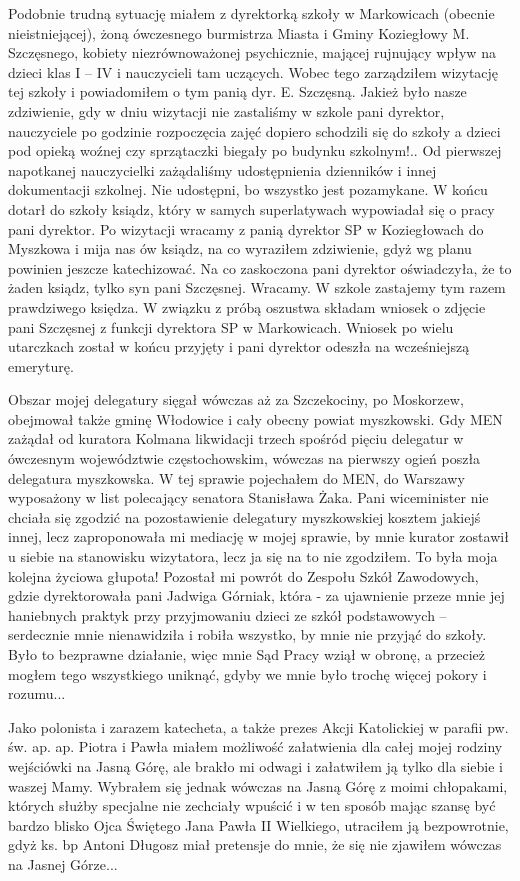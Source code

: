Podobnie trudną sytuację miałem z dyrektorką szkoły w Markowicach (obecnie nieistniejącej), żoną ówczesnego burmistrza Miasta i Gminy Koziegłowy M. Szczęsnego, kobiety niezrównoważonej psychicznie, mającej rujnujący wpływ na dzieci klas I – IV i nauczycieli tam uczących. Wobec tego  zarządziłem wizytację tej szkoły i powiadomiłem o tym panią dyr.  E. Szczęsną. Jakież było nasze zdziwienie, gdy w dniu wizytacji nie zastaliśmy w szkole pani dyrektor, nauczyciele po godzinie rozpoczęcia zajęć dopiero schodzili się do szkoły a dzieci pod opieką woźnej czy sprzątaczki biegały po budynku szkolnym!.. Od pierwszej napotkanej nauczycielki zażądaliśmy udostępnienia dzienników i innej dokumentacji szkolnej. Nie udostępni, bo wszystko jest pozamykane. W końcu dotarł do szkoły ksiądz, który w samych superlatywach wypowiadał się o pracy pani dyrektor. Po wizytacji wracamy z panią dyrektor SP w Koziegłowach do Myszkowa i mija nas ów ksiądz, na co wyraziłem zdziwienie, gdyż wg planu powinien jeszcze katechizować. Na co zaskoczona pani dyrektor oświadczyła, że to żaden ksiądz, tylko syn pani Szczęsnej. Wracamy. W szkole zastajemy tym razem prawdziwego księdza. W związku z próbą oszustwa składam wniosek o zdjęcie pani Szczęsnej z funkcji dyrektora SP w Markowicach. Wniosek po wielu utarczkach został w końcu przyjęty i pani dyrektor odeszła na wcześniejszą emeryturę.

Obszar mojej delegatury sięgał wówczas aż za Szczekociny, po Moskorzew, obejmował także gminę Włodowice i cały obecny powiat myszkowski. Gdy MEN zażądał od kuratora Kolmana likwidacji trzech spośród pięciu delegatur w ówczesnym województwie częstochowskim, wówczas na pierwszy ogień poszła delegatura myszkowska. W tej sprawie pojechałem do MEN, do Warszawy wyposażony w list polecający senatora Stanisława Żaka. Pani wiceminister nie chciała się zgodzić na pozostawienie delegatury myszkowskiej kosztem jakiejś innej, lecz zaproponowała mi mediację w mojej sprawie, by mnie kurator zostawił u siebie na stanowisku wizytatora, lecz ja się na to nie zgodziłem. To była moja kolejna życiowa głupota! Pozostał mi powrót do Zespołu Szkół Zawodowych, gdzie dyrektorowała pani Jadwiga Górniak, która - za ujawnienie przeze mnie jej haniebnych praktyk przy przyjmowaniu dzieci ze szkół podstawowych – serdecznie mnie nienawidziła i robiła wszystko, by mnie nie przyjąć do szkoły. Było to bezprawne działanie, więc mnie Sąd Pracy wziął w obronę, a przecież mogłem tego wszystkiego uniknąć, gdyby we mnie było trochę więcej pokory i rozumu...

Jako polonista i zarazem katecheta, a także prezes Akcji Katolickiej w parafii pw. św. ap. ap. Piotra i Pawła miałem możliwość załatwienia dla całej mojej rodziny wejściówki na Jasną Górę, ale brakło mi odwagi i załatwiłem ją tylko dla siebie i waszej Mamy. Wybrałem się jednak wówczas na Jasną Górę z moimi chłopakami, których służby specjalne nie zechciały wpuścić i w ten sposób mając szansę być bardzo blisko Ojca Świętego Jana Pawła II Wielkiego, utraciłem ją bezpowrotnie, gdyż ks. bp Antoni Długosz miał pretensje do mnie, że się nie zjawiłem wówczas na Jasnej Górze...

